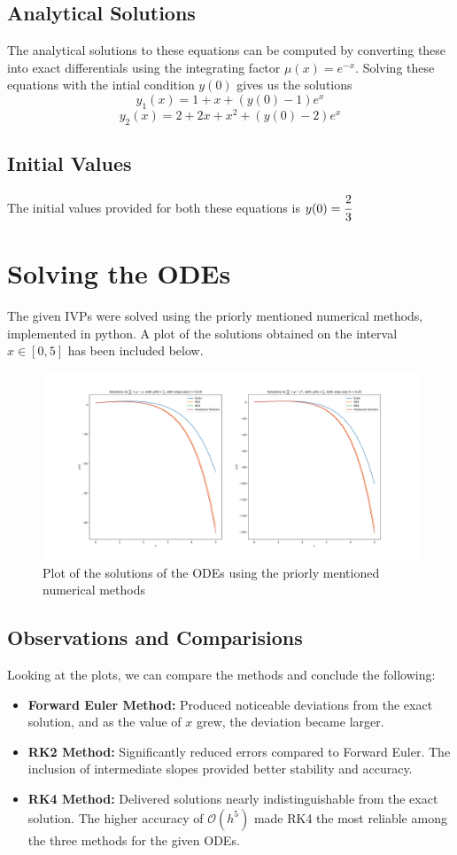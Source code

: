 \documentclass{scrartcl}
\newcommand{\bigO}{\mathcal{O}}
\begin{document}
\subsection{Analytical Solutions}
The analytical solutions to these equations can be computed by converting these into exact differentials using the integrating factor $\mu(x) = e^{-x}$. Solving these equations with the intial condition $y(0)$ gives us the solutions
$$y_1(x) = 1 + x + (y(0) - 1)e^x$$
$$y_2(x) = 2 + 2x + x^2 + (y(0) - 2)e^x$$
\subsection{Initial Values}
The initial values provided for both these equations is $y(0) = \cfrac{2}{3}$
\section{Solving the ODEs}
The given IVPs were solved using the priorly mentioned numerical methods, implemented in python.
A plot of the solutions obtained on the interval $x \in [0, 5]$ has been included below.
\begin{figure}[h]
    \centering
    \includegraphics[width=\linewidth]{"solutions.png"}
    \caption{Plot of the solutions of the ODEs using the priorly mentioned numerical methods}
\end{figure}
\subsection{Observations and Comparisions}
Looking at the plots, we can compare the methods and conclude the following:
\begin{itemize}
    \item \textbf{Forward Euler Method:} Produced noticeable deviations from the exact solution, and as the value of $x$ grew, the
        deviation became larger.
    \item \textbf{RK2 Method:} Significantly reduced errors compared to Forward Euler. The inclusion of intermediate slopes provided better stability and accuracy.
    \item \textbf{RK4 Method:} Delivered solutions nearly indistinguishable from the exact solution. The higher accuracy of $\bigO(h^5)$ made RK4 the most reliable among the three methods for the given ODEs. 
\end{itemize}
\end{document}
